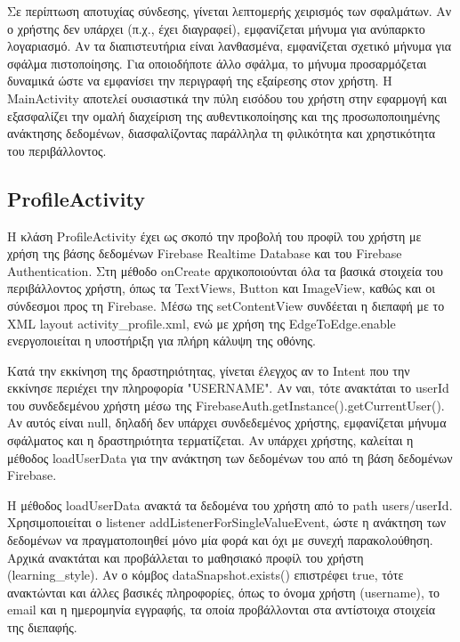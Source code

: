 \documentclass[11pt]{report}
\begin{document}
Σε περίπτωση αποτυχίας σύνδεσης, γίνεται λεπτομερής χειρισμός των σφαλμάτων. Αν ο χρήστης δεν υπάρχει (π.χ., έχει διαγραφεί), εμφανίζεται μήνυμα για ανύπαρκτο λογαριασμό. Αν τα διαπιστευτήρια είναι λανθασμένα, εμφανίζεται σχετικό μήνυμα για σφάλμα πιστοποίησης. Για οποιοδήποτε άλλο σφάλμα, το μήνυμα προσαρμόζεται δυναμικά ώστε να εμφανίσει την περιγραφή της εξαίρεσης στον χρήστη.
Η MainActivity αποτελεί ουσιαστικά την πύλη εισόδου του χρήστη στην εφαρμογή και εξασφαλίζει την ομαλή διαχείριση της αυθεντικοποίησης και της προσωποποιημένης ανάκτησης δεδομένων, διασφαλίζοντας παράλληλα τη φιλικότητα και χρηστικότητα του περιβάλλοντος.

\subsection{ProfileActivity}

Η κλάση ProfileActivity έχει ως σκοπό την προβολή του προφίλ του χρήστη με χρήση της βάσης δεδομένων Firebase Realtime Database και του Firebase Authentication. Στη μέθοδο onCreate αρχικοποιούνται όλα τα βασικά στοιχεία του περιβάλλοντος χρήστη, όπως τα TextViews, Button και ImageView, καθώς και οι σύνδεσμοι προς τη Firebase. Μέσω της setContentView συνδέεται η διεπαφή με το XML layout activity\_profile.xml, ενώ με χρήση της EdgeToEdge.enable ενεργοποιείται η υποστήριξη για πλήρη κάλυψη της οθόνης.

Κατά την εκκίνηση της δραστηριότητας, γίνεται έλεγχος αν το Intent που την εκκίνησε περιέχει την πληροφορία "USERNAME". Αν ναι, τότε ανακτάται το userId του συνδεδεμένου χρήστη μέσω της FirebaseAuth.getInstance().getCurrentUser(). Αν αυτός είναι null, δηλαδή δεν υπάρχει συνδεδεμένος χρήστης, εμφανίζεται μήνυμα σφάλματος και η δραστηριότητα τερματίζεται. Αν υπάρχει χρήστης, καλείται η μέθοδος loadUserData για την ανάκτηση των δεδομένων του από τη βάση δεδομένων Firebase.

Η μέθοδος loadUserData ανακτά τα δεδομένα του χρήστη από το path users/{userId}. Χρησιμοποιείται ο listener addListenerForSingleValueEvent, ώστε η ανάκτηση των δεδομένων να πραγματοποιηθεί μόνο μία φορά και όχι με συνεχή παρακολούθηση. Αρχικά ανακτάται και προβάλλεται το μαθησιακό προφίλ του χρήστη (learning\_style). Αν ο κόμβος dataSnapshot.exists() επιστρέφει true, τότε ανακτώνται και άλλες βασικές πληροφορίες, όπως το όνομα χρήστη (username), το email και η ημερομηνία εγγραφής, τα οποία προβάλλονται στα αντίστοιχα στοιχεία της διεπαφής.
\end{document}

